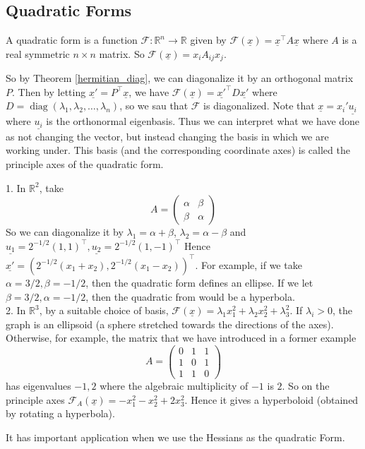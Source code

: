 \subsection{Quadratic Forms}
\begin{definition}
    A quadratic form is a function $\mathcal F:\mathbb R^n\to\mathbb R$ given by $\mathcal{F}(\underline{x})=\underline{x}^\top A\underline{x}$ where $A$ is a real symmetric $n\times n$ matrix.
    So $\mathcal F(\underline{x})=x_iA_{ij}x_j$.
\end{definition}
So by Theorem \ref{hermitian_diag}, we can diagonalize it by an orthogonal matrix $P$.
Then by letting $\underline{x'}=P^\top\underline{x}$, we have $\mathcal F(\underline{x})=\underline{x'}^\top D\underline{x'}$ where $D=\operatorname{diag}(\lambda_1,\lambda_2,\ldots,\lambda_n)$, so we sau that $\mathcal F$ is diagonalized.
Note that $\underline{x}=x_i'\underline{u_i}$ where $\underline{u_i}$ is the orthonormal eigenbasis.
Thus we can interpret what we have done as not changing the vector, but instead changing the basis in which we are working under.
This basis (and the corresponding coordinate axes) is called the principle axes of the quadratic form.
\begin{example}
    1. In $\mathbb R^2$, take
    $$A=\begin{pmatrix}
        \alpha&\beta\\
        \beta&\alpha
    \end{pmatrix}$$
    So we can diagonalize it by $\lambda_1=\alpha+\beta$, $\lambda_2=\alpha-\beta$ and $\underline{u_1}=2^{-1/2}(1,1)^\top,\underline{u_2}=2^{-1/2}(1,-1)^\top$
    Hence $\underline{x'}=(2^{-1/2}(x_1+x_2),2^{-1/2}(x_1-x_2))^\top$.
    For example, if we take $\alpha=3/2,\beta=-1/2$, then the quadratic form defines an ellipse.
    If we let $\beta=3/2,\alpha=-1/2$, then the quadratic from would be a hyperbola.\\
    2. In $\mathbb R^3$, by a suitable choice of basis, $\mathcal F(\underline{x})=\lambda_1x_1^2+\lambda_2x_2^2+\lambda_3^2$.
    If $\lambda_i>0$, the graph is an ellipsoid (a sphere stretched towards the directions of the axes).
    Otherwise, for example, the matrix that we have introduced in a former example 
    $$A=\begin{pmatrix}
        0&1&1\\
        1&0&1\\
        1&1&0
    \end{pmatrix}$$
    has eigenvalues $-1,2$ where the algebraic multiplicity of $-1$ is $2$.
    So on the principle axes $\mathcal F_A(\underline{x})=-x_1^2-x_2^2+2x_3^2$.
    Hence it gives a hyperboloid (obtained by rotating a hyperbola).
\end{example}
It has important application when we use the Hessians as the quadratic Form.

